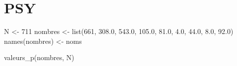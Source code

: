 \documentclass[
]{article}
\newenvironment{Shaded}{\begin{snugshade}}{\end{snugshade}}
\newcommand{\DecValTok}[1]{\textcolor[rgb]{0.00,0.00,0.81}{#1}}
\newcommand{\FloatTok}[1]{\textcolor[rgb]{0.00,0.00,0.81}{#1}}
\newcommand{\FunctionTok}[1]{\textcolor[rgb]{0.00,0.00,0.00}{#1}}
\newcommand{\NormalTok}[1]{#1}
\newcommand{\OtherTok}[1]{\textcolor[rgb]{0.56,0.35,0.01}{#1}}
\begin{document}
\hypertarget{psy}{%
\section{PSY}\label{psy}}

\begin{Shaded}
\begin{Highlighting}[]
\NormalTok{N }\OtherTok{\textless{}{-}} \DecValTok{711}
\NormalTok{nombres }\OtherTok{\textless{}{-}} \FunctionTok{list}\NormalTok{(}\DecValTok{661}\NormalTok{, }\FloatTok{308.0}\NormalTok{, }\FloatTok{543.0}\NormalTok{,  }\FloatTok{105.0}\NormalTok{, }\FloatTok{81.0}\NormalTok{, }\FloatTok{4.0}\NormalTok{,  }\FloatTok{44.0}\NormalTok{, }\FloatTok{8.0}\NormalTok{, }\FloatTok{92.0}\NormalTok{)}
\FunctionTok{names}\NormalTok{(nombres) }\OtherTok{\textless{}{-}}\NormalTok{ noms}

\FunctionTok{valeurs\_p}\NormalTok{(nombres, N)}
\end{Highlighting}
\end{Shaded}
\end{document}
